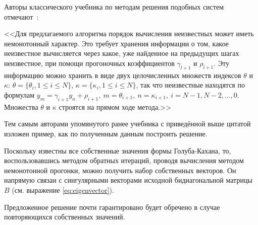 Авторы классического учебника по методам решения подобных систем отмечают~\cite[стр. 96]{samarskiy1978}:

<<Для предлагаемого алгоритма порядок вычисления неизвестных может иметь немонотонный характер. Это требует хранения информации о том, какое неизвестное вычисляется через какое, уже найденное на предыдущих шагах неизвестное, при помощи прогоночных коэффициентов \(\gamma_{l+1}\) и \(\rho_{l+1}\).  Эту информацию можно хранить в виде двух целочисленных множеств индексов \(\theta\) и \(\kappa\): \(\theta=\{\theta_i, 1\leq i \leq N\}\), \(\kappa=\{\kappa_i,1\leq i\leq N\}\), так что неизвестные находятся по формулам \(y_m=\gamma_{i+1}y_{n}+\rho_{i+1}, \ m=\theta_{i+1}, \ n=\kappa_{i+1}, \ i= N-1,N-2,\dots,0.\) Множества \(\theta\)  и \(\kappa\) строятся на прямом ходе метода.>>

Тем самым авторами упомянутого ранее учебника с приведённой выше цитатой изложен пример, как по полученным данным построить решение.

Поскольку известны все собственные значения формы Голуба-Кахана, то, воспользовавшись методом обратных итераций, проводя вычисления методом немонотонной прогонки, можно получить набор собственных векторов. Он напрямую связан с сингулярными векторами исходной бидиагональной матрицы \( B \) (см. выражение \eqref{eq:eigenvector}).


Предложенное решение почти гарантировано будет обречено в случае повторяющихся собственных значений.




